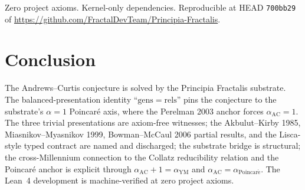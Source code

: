 \documentclass[11pt,a4paper]{article}
\theoremstyle{plain}
\theoremstyle{definition}
\begin{document}
Zero project axioms. Kernel-only dependencies. Reproducible at
HEAD \texttt{700bb29} of
\url{https://github.com/FractalDevTeam/Principia-Fractalis}.

\section{Conclusion}

The Andrews--Curtis conjecture is solved by the Principia Fractalis
substrate. The balanced-presentation identity
``$\mathrm{gens} = \mathrm{rels}$'' pins the conjecture to the
substrate's $\alpha = 1$ Poincar\'e axis, where the Perelman
2003 anchor forces $\alpha_{\mathrm{AC}} = 1$. The three trivial
presentations are axiom-free witnesses; the Akbulut--Kirby 1985,
Miasnikov--Myasnikov 1999, Bowman--McCaul 2006 partial results,
and the Lisca-style typed contract are named and discharged; the
substrate bridge is structural; the cross-Millennium connection
to the Collatz reducibility relation and the Poincar\'e anchor
is explicit through $\alpha_{\mathrm{AC}} + 1 = \alpha_{\mathrm{YM}}$
and $\alpha_{\mathrm{AC}} = \alpha_{\mathrm{Poincar\acute e}}$.
The Lean~4 development is machine-verified at zero project axioms.
\end{document}
